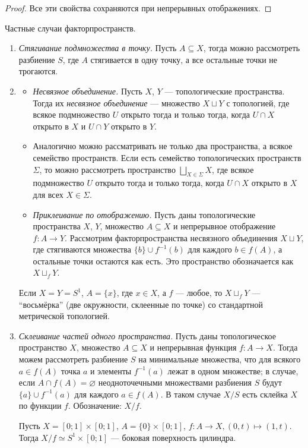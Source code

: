 \documentclass[12pt,a4paper]{article}
\begin{document}
    \begin{proof}
        Все эти свойства сохраняются при непрерывных отображениях.
    \end{proof}

    \begin{definition}
        Частные случаи факторпространств.
        \begin{enumerate}
            \item \emph{Стягивание подмножества в точку.} Пусть $A \subseteq X$, тогда можно рассмотреть разбиение $S$, где $A$ стягивается в одну точку, а все остальные точки не трогаются.

            \item
            \begin{itemize}
                \item \emph{Несвязное объединение.} Пусть $X$, $Y$ --- топологические пространства. Тогда их \emph{несвязное объединение} --- множество $X \sqcup Y$ с топологией, где всякое подмножество $U$ открыто тогда и только тогда, когда $U \cap X$ открыто в $X$ и $U \cap Y$ открыто в $Y$.
                \item Аналогично можно рассматривать не только два пространства, а всякое семейство пространств. Если есть семейство топологических пространств $\Sigma$, то можно рассмотреть пространство $\bigsqcup_{X \in \Sigma} X$, где всякое подмножество $U$ открыто тогда и только тогда, когда $U \cap X$ открыто в $X$ для всех $X \in \Sigma$.
                \item \emph{Приклеивание по отображению.} Пусть даны топологические пространства $X$, $Y$, множество $A \subseteq X$ и непрерывное отображение $f: A \to Y$. Рассмотрим факторпространства несвязного объединения $X \sqcup Y$, где стягиваются множества $\{b\} \cup f^{-1}(b)$ для каждого $b \in f(A)$, а остальные точки остаются как есть. Это пространство обозначается как $X \sqcup_f Y$.
            \end{itemize}
            \begin{example}
                Если $X = Y = S^1$, $A = \{x\}$, где $x \in X$, а $f$ --- любое, то $X \sqcup_f Y$ --- ``восьмёрка'' (две окружности, склеенные по точке) со стандартной метрической топологией.
            \end{example}

            \item \emph{Склеивание частей одного пространства.} Пусть даны топологическое пространство $X$, множество $A \subseteq X$ и непрерывная функция $f: A \to X$. Тогда можем рассмотреть разбиение $S$ на минимальные множества, что для всякого $a \in f(A)$ точка $a$ и элементы $f^{-1}(a)$ лежат в одном множестве; в случае, если $A \cap f(A) = \varnothing$ неодноточечными множествами разбиения $S$ будут $\{a\} \cup f^{-1}(a)$ для каждого $a \in f(A)$. В таком случае $X/S$ есть склейка $X$ по функции $f$. Обозначение: $X/f$.
            \begin{example}
                Пусть $X = [0; 1] \times [0; 1]$, $A = \{0\} \times [0; 1]$, $f: A \to X, (0, t) \mapsto (1, t)$. Тогда $X/f \simeq S^1 \times [0; 1]$ --- боковая поверхность цилиндра.
            \end{example}


\end{enumerate}
\end{definition}
\end{document}
